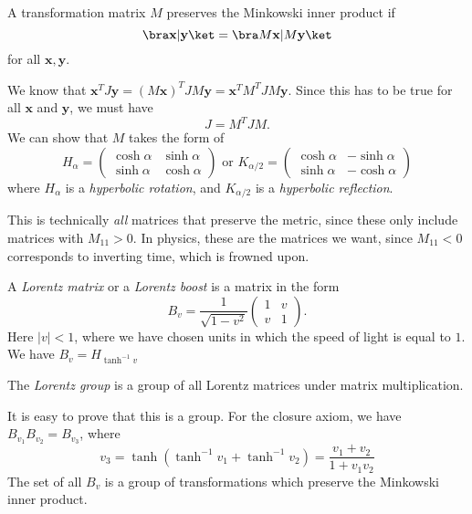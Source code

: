 \documentclass[a4paper]{article}
\begin{document}
\begin{defi}
  A transformation matrix $M$ preserves the Minkowski inner product if
  \[
    \bra \mathbf{x}|\mathbf{y}\ket = \bra M\mathbf{x} | M\mathbf{y}\ket
  \]
  for all $\mathbf{x}, \mathbf{y}$.
\end{defi}

We know that $\mathbf{x}^TJ\mathbf{y} = (M\mathbf{x})^TJM\mathbf{y} = \mathbf{x}^T M^TJM\mathbf{y}$. Since this has to be true for all $\mathbf{x}$ and $\mathbf{y}$, we must have
\[
  J = M^TJM.
\]
We can show that $M$ takes the form of
\[
  H_\alpha = \begin{pmatrix}
    \cosh \alpha & \sinh \alpha\\
    \sinh \alpha & \cosh \alpha
  \end{pmatrix}\text{ or } K_{\alpha/2} =
  \begin{pmatrix}
    \cosh\alpha & -\sinh\alpha\\
    \sinh\alpha & -\cosh\alpha
  \end{pmatrix}
\]
where $H_\alpha$ is a \emph{hyperbolic rotation}, and $K_{\alpha/2}$ is a \emph{hyperbolic reflection}.

This is technically \emph{all} matrices that preserve the metric, since these only include matrices with $M_{11} > 0$. In physics, these are the matrices we want, since $M_{11} < 0$ corresponds to inverting time, which is frowned upon.

\begin{defi}
  A \emph{Lorentz matrix} or a \emph{Lorentz boost} is a matrix in the form
  \[
    B_v = \frac{1}{\sqrt{1 - v^2}}
    \begin{pmatrix}
      1 & v\\
      v & 1
    \end{pmatrix}.
  \]
  Here $|v| < 1$, where we have chosen units in which the speed of light is equal to $1$. We have $B_v = H_{\tanh^{-1}v}$
\end{defi}

\begin{defi}
  The \emph{Lorentz group} is a group of all Lorentz matrices under matrix multiplication.
\end{defi}
It is easy to prove that this is a group. For the closure axiom, we have $B_{v_1}B_{v_2} = B_{v_3}$, where
\[
  v_3 = \tanh(\tanh^{-1} v_1 + \tanh^{-1} v_2) = \frac{v_1 + v_2}{1 + v_1v_2}
\]
The set of all $B_v$ is a group of transformations which preserve the Minkowski inner product.
\end{document}
